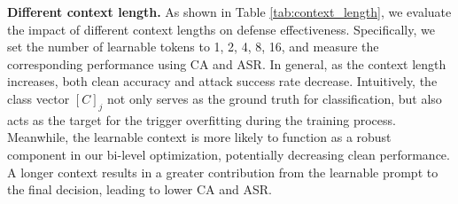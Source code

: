 \textbf{Different context length.}
As shown in Table \ref{tab:context_length}, we evaluate the impact of different context lengths on defense effectiveness. Specifically, we set the number of learnable tokens to 1, 2, 4, 8, 16, and measure the corresponding performance using CA and ASR. In general, as the context length increases, both clean accuracy and attack success rate decrease. Intuitively, the class vector $[C]_j$ not only serves as the ground truth for classification, but also acts as the target for the trigger overfitting during the training process. Meanwhile, the learnable context is more likely to function as a robust component in our bi-level optimization, potentially decreasing clean performance. A longer context results in a greater contribution from the learnable prompt to the final decision, leading to lower CA and ASR.
